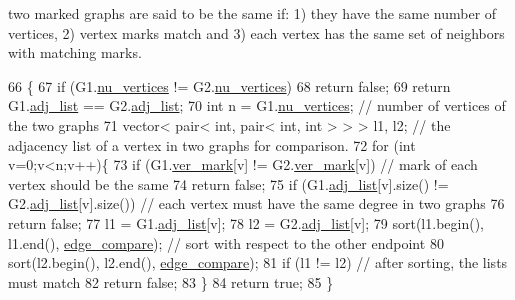 two marked graphs are said to be the same if\+: 1) they have the same number of vertices, 2) vertex marks match and 3) each vertex has the same set of neighbors with matching marks. 
\begin{DoxyCode}
66 \{
67   \textcolor{keywordflow}{if} (G1.\hyperlink{classmarked__graph_acf79c6aeb8f32614cb14a5baaa6c9f9b}{nu\_vertices} != G2.\hyperlink{classmarked__graph_acf79c6aeb8f32614cb14a5baaa6c9f9b}{nu\_vertices})
68     \textcolor{keywordflow}{return} \textcolor{keyword}{false};
69   \textcolor{keywordflow}{return} G1.\hyperlink{classmarked__graph_a1a0bf7ca413a278763f7c878b3b6fd6f}{adj\_list} == G2.\hyperlink{classmarked__graph_a1a0bf7ca413a278763f7c878b3b6fd6f}{adj\_list};
70   \textcolor{keywordtype}{int} n = G1.\hyperlink{classmarked__graph_acf79c6aeb8f32614cb14a5baaa6c9f9b}{nu\_vertices}; \textcolor{comment}{// number of vertices of the two graphs}
71   vector< pair< int, pair< int, int > > > l1, l2; \textcolor{comment}{// the adjacency list of a vertex in two graphs for
       comparison. }
72   \textcolor{keywordflow}{for} (\textcolor{keywordtype}{int} v=0;v<n;v++)\{
73     \textcolor{keywordflow}{if} (G1.\hyperlink{classmarked__graph_ac83e9377dd4d8bb95be1ac949b127296}{ver\_mark}[v] != G2.\hyperlink{classmarked__graph_ac83e9377dd4d8bb95be1ac949b127296}{ver\_mark}[v]) \textcolor{comment}{// mark of each vertex should be the same}
74       \textcolor{keywordflow}{return} \textcolor{keyword}{false};
75     \textcolor{keywordflow}{if} (G1.\hyperlink{classmarked__graph_a1a0bf7ca413a278763f7c878b3b6fd6f}{adj\_list}[v].size() != G2.\hyperlink{classmarked__graph_a1a0bf7ca413a278763f7c878b3b6fd6f}{adj\_list}[v].size()) \textcolor{comment}{// each vertex must have the same
       degree in two graphs}
76       \textcolor{keywordflow}{return} \textcolor{keyword}{false};
77     l1 = G1.\hyperlink{classmarked__graph_a1a0bf7ca413a278763f7c878b3b6fd6f}{adj\_list}[v];
78     l2 = G2.\hyperlink{classmarked__graph_a1a0bf7ca413a278763f7c878b3b6fd6f}{adj\_list}[v];
79     sort(l1.begin(), l1.end(), \hyperlink{marked__graph_8cpp_a09dd24caed50b1d106e10538e688b6ac}{edge\_compare}); \textcolor{comment}{// sort with respect to the other endpoint}
80     sort(l2.begin(), l2.end(), \hyperlink{marked__graph_8cpp_a09dd24caed50b1d106e10538e688b6ac}{edge\_compare});
81     \textcolor{keywordflow}{if} (l1 != l2) \textcolor{comment}{// after sorting, the lists must match}
82       \textcolor{keywordflow}{return} \textcolor{keyword}{false};
83   \}
84   \textcolor{keywordflow}{return} \textcolor{keyword}{true};
85 \}
\end{DoxyCode}


